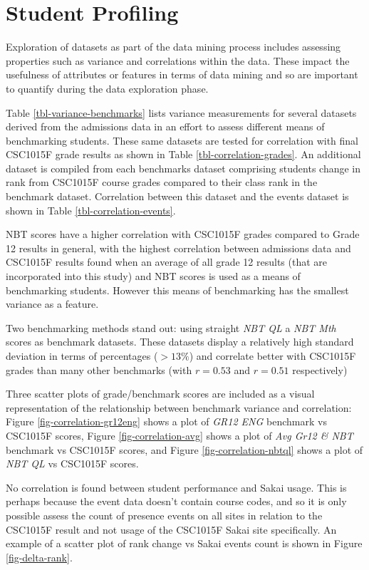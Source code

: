 \section{Student Profiling}
Exploration of datasets as part of the data mining process includes assessing properties such as variance and correlations within the data. These impact the usefulness of attributes or features in terms of data mining and so are important to quantify during the data exploration phase.

Table \ref{tbl-variance-benchmarks} lists variance measurements for several datasets derived from the admissions data in an effort to assess different means of benchmarking students. These same datasets are tested for correlation with final CSC1015F grade results as shown in Table \ref{tbl-correlation-grades}. An additional dataset is compiled from each benchmarks dataset comprising students change in rank from CSC1015F course grades compared to their class rank in the benchmark dataset. Correlation between this dataset and the events dataset is shown in Table \ref{tbl-correlation-events}.





NBT scores have a higher correlation with CSC1015F grades compared to Grade 12 results in general, with the highest correlation between admissions data and CSC1015F results found when an average of all grade 12 results (that are incorporated into this study) and NBT scores is used as a means of benchmarking students. However this means of benchmarking has the smallest variance as a feature.

Two benchmarking methods stand out: using straight \textit{NBT QL} a \textit{NBT Mth} scores as benchmark datasets. These datasets display a relatively high standard deviation in terms of percentages ($> 13\%$) and correlate better with CSC1015F grades than many other benchmarks (with $r = 0.53$ and $r = 0.51$ respectively)

Three scatter plots of grade/benchmark scores are included as a visual representation of the relationship between benchmark variance and correlation: Figure \ref{fig-correlation-gr12eng} shows a plot of \textit{GR12 ENG} benchmark vs CSC1015F scores, Figure \ref{fig-correlation-avg} shows a plot of \textit{Avg Gr12 \& NBT} benchmark vs CSC1015F scores, and Figure \ref{fig-correlation-nbtql} shows a plot of \textit{NBT QL} vs CSC1015F scores.

No correlation is found between student performance and Sakai usage. This is perhaps because the event data doesn't contain course codes, and so it is only possible assess the count of presence events on all sites in relation to the CSC1015F result and not usage of the CSC1015F Sakai site specifically. An example of a scatter plot of rank change vs Sakai events count is shown in Figure \ref{fig-delta-rank}.




